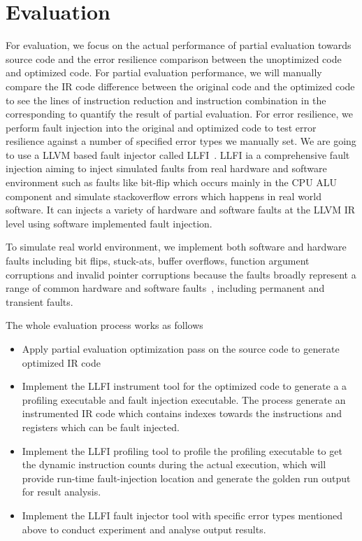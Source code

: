 \section{Evaluation}
\label{sec:evaluation}

For evaluation, we focus on the actual performance of partial evaluation towards source code and the error resilience comparison between the unoptimized code and optimized code.
For partial evaluation performance, we will manually compare the IR code difference between the original code and the optimized code to see the lines of instruction reduction and instruction combination in the corresponding to quantify the result of partial evaluation.
For error resilience, we perform fault injection into the original and optimized code to test error resilience against a number of specified error types we manually set. 
We are going to use a LLVM based fault injector called LLFI~\cite{LLFI}.
LLFI ia a comprehensive fault injection aiming to inject simulated faults from real hardware and software environment such as faults like bit-flip which occurs mainly in the CPU ALU component and simulate stackoverflow errors which happens in real world software. It can injects a variety of hardware and software faults at the LLVM IR level using software implemented fault injection.

To simulate real world environment, we implement both software and hardware faults including bit flips, stuck-ats, buffer overflows, function argument corruptions and invalid pointer corruptions because the faults broadly represent a range of common hardware and software faults~\cite{V2005}, including permanent and transient faults. 

The whole evaluation process works as follows
\begin{itemize}
\item Apply partial evaluation optimization pass on the source code to generate optimized IR code
\item Implement the LLFI instrument tool for the optimized code to generate a a profiling executable and fault injection executable. The process generate an instrumented IR code which contains indexes towards the instructions and registers which can be fault injected.
\item Implement the LLFI profiling tool to profile the profiling executable to get the dynamic instruction counts during the actual execution, which will provide run-time fault-injection location and generate the golden run output for result analysis.
\item Implement the LLFI fault injector tool with specific error types mentioned above to conduct experiment and analyse output results.
\end{itemize}

